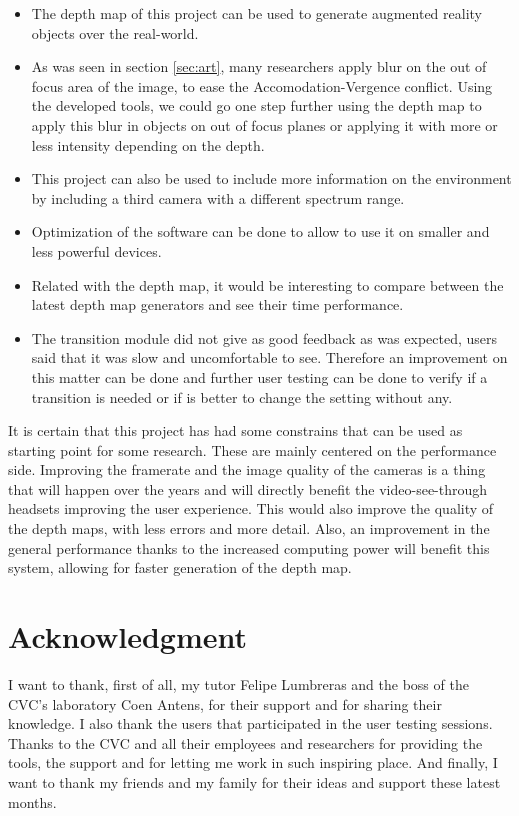 \documentclass[10pt,a4paper,twocolumn,twoside]{article}
\begin{document}
	\begin{itemize}
		\item The depth map of this project can be used to generate augmented reality objects over the real-world.
		
		\item As was seen in section \ref{sec:art}, many researchers apply blur on the out of focus area of the image, to ease the Accomodation-Vergence conflict. Using the developed tools, we could go one step further using the depth map to apply this blur in objects on out of focus planes or applying it with more or less intensity depending on the depth. 
		
		\item This project can also be used to include more information on the environment by including a third camera with a different spectrum range.  
		
		\item Optimization of the software can be done to allow to use it on smaller and less powerful devices. 
		
		\item Related with the depth map, it would be interesting to compare between the latest depth map generators and see their time performance. 
		
		\item The transition module did not give as good feedback as was expected, users said that it was slow and uncomfortable to see. Therefore an improvement on this matter can be done and further user testing can be done to verify if a transition is needed or if is better to change the setting without any.
	\end{itemize}

	It is certain that this project has had some constrains that can be used as starting point for some research. These are mainly centered on the performance side. Improving the framerate and the image quality of the cameras is a thing that will happen over the years and will directly benefit the video-see-through headsets improving the user experience.
	This would also improve the quality of the depth maps, with less errors and more detail. Also, an improvement in the general performance thanks to the increased computing power will benefit this system, allowing for faster generation of the depth map.  
	
	\section*{Acknowledgment}
	I want to thank, first of all, my tutor Felipe Lumbreras and the boss of the CVC's laboratory Coen Antens, for their support and for sharing their knowledge. I also thank the users that participated in the user testing sessions. Thanks to the CVC and all their employees and researchers for providing the tools, the support and for letting me work in such inspiring place. And finally, I want to thank my friends and my family for their ideas and support these latest months. 
	
\end{document}
